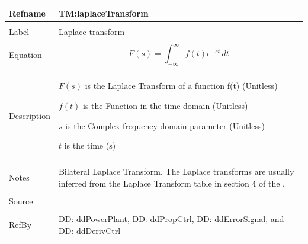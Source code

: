 \documentclass[12pt]{article}
\begin{document}
\vspace{\baselineskip}
\noindent
\begin{minipage}{\textwidth}
\begin{tabular}{>{\raggedright}p{}>{\raggedright\arraybackslash}p{}}
\toprule \textbf{Refname} & \textbf{TM:laplaceTransform}
\label{TM:laplaceTransform}
\\ \midrule \\
Label & Laplace transform
        
\\ \midrule \\
Equation & \begin{displaymath}
           F(s)=\int_{-∞}^{∞}{f(t) e^{-s t}}\,dt
           \end{displaymath}
\\ \midrule \\
Description & \begin{symbDescription}
              \item{$F(s)$ is the Laplace Transform of a function f(t) (Unitless)}
              \item{$f(t)$ is the Function in the time domain (Unitless)}
              \item{$s$ is the Complex frequency domain parameter (Unitless)}
              \item{$t$ is the time (${\text{s}}$)}
              \end{symbDescription}
\\ \midrule \\
Notes & Bilateral Laplace Transform. The Laplace transforms are  usually inferred from the Laplace Transform table in   section 4 of the  \cite{laplaceWiki}.
        
\\ \midrule \\
Source & \cite{laplaceWiki}
         
\\ \midrule \\
RefBy & \hyperref[DD:ddPowerPlant]{DD: ddPowerPlant}, \hyperref[DD:ddPropCtrl]{DD: ddPropCtrl}, \hyperref[DD:ddErrorSignal]{DD: ddErrorSignal}, and \hyperref[DD:ddDerivCtrl]{DD: ddDerivCtrl}
        
\\ \bottomrule
\end{tabular}
\end{minipage}
\vspace{\baselineskip}
\noindent
\end{document}
